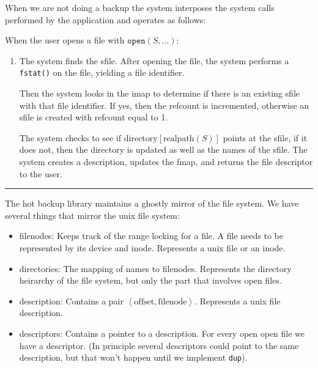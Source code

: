 \documentclass[10pt]{article}
\begin{document}
When we are not doing a backup the system interposes the system calls
performed by the application and operates as follows:

When the user opens a file with $\texttt{open}(S,...)$:
 \begin{enumerate}
 \item The system finds the sfile.  After opening the file, the system
   performs a \texttt{fstat()} on the file, yielding a file identifier.

   Then the system looks in the imap to determine if there is an existing sfile with that file identifier.  If yes, then the refcount is incremented, otherwise an sfile is created with refcount equal to 1.

   The system checks to see if $\mbox{directory}[\mbox{realpath}(S)]$ points at the sfile, if it does not, then the directory is updated as well as the names of the sfile.
   The system creates a description, updates the fmap, and returns the file descriptor to the user.

   \end{enumerate}   

 \hrule

The hot backup library maintains a ghostly mirror of the file system.  We have several things that mirror the unix file system:
\begin{itemize}
\item filenodes: Keeps track of the range locking for a file.  A file needs to be represented by its device and inode.  Represents a unix file or an inode.
\item directories: The mapping of names to filenodes. Represents the directory heirarchy of the file system, but only the part that involves open files.
\item description: Contains a pair $\left<\mbox{offset},\mbox{filenode}\right>$.  Represents a unix file description.
\item descriptors: Contains a pointer to a description.  For every open open file we have a descriptor.  (In principle several descriptors could point to the same description, but that won't happen until we implement \texttt{dup}).
\end{itemize}
\end{document}
